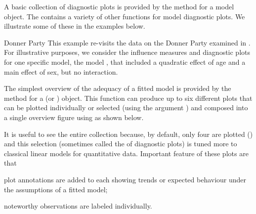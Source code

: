 \documentclass[11pt]{book}
\begin{document}
A basic collection of diagnostic plots is provided by the  method for a 
 model object. The  contains a variety of other functions
for model diagnostic plots.  We illustrate some of these in the examples below.



\begin{Example}[donner2]{Donner Party}
This example re-visits the data on the Donner Party examined in .
For illustrative purposes, we consider the influence measures and diagnostic plots
for one specific model, the model , that included a 
quadratic effect of age and a main effect of sex, but no interaction.

The simplest overview of the adequacy of a fitted model is provided by the
 method for a  (or ) object.
This function can produce up to six different plots that can be plotted individually
or selected (using the argument ) and composed into a single overview
figure using  as shown below. 

It is useful to see the entire collection because, by default, only four
are plotted () and this selection 
(sometimes called the  of diagnostic plots)
is tuned more to classical
linear models for quantitative data.  Important feature of these plots are that
\begin{seriate}
 \item plot annotations are added to each showing trends or expected behaviour
 under the assumptions of a fitted model;
 \item noteworthy observations are labeled individually.
\end{seriate}


\end{Example}
\end{document}
